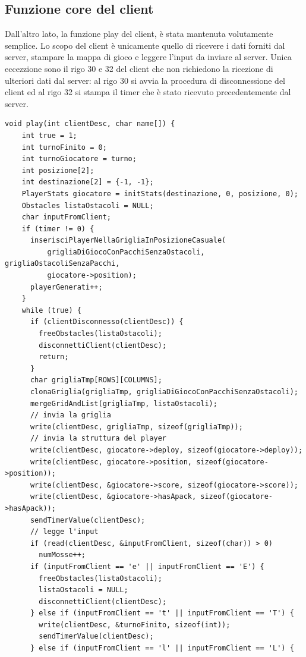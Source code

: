\documentclass[a4paper]{article}
\begin{document}
\subsection{Funzione core del client}
Dall'altro lato, la funzione play del client, è stata mantenuta volutamente semplice.
Lo scopo del client è unicamente quello di ricevere i dati forniti dal server, stampare la mappa di gioco e leggere l'input da inviare al server.
Unica eccezzione sono il rigo 30 e 32 del client che non richiedono la ricezione di ulteriori dati dal server: al rigo 30 si avvia la procedura di disconnessione del client ed al rigo 32 si stampa il timer che è stato ricevuto precedentemente dal server.
\pagebreak
\begin{lstlisting}[caption=Funzione play del server, label=alg:playServer]
  void play(int clientDesc, char name[]) {
    int true = 1;
    int turnoFinito = 0;
    int turnoGiocatore = turno;
    int posizione[2];
    int destinazione[2] = {-1, -1};
    PlayerStats giocatore = initStats(destinazione, 0, posizione, 0);
    Obstacles listaOstacoli = NULL;
    char inputFromClient;
    if (timer != 0) {
      inserisciPlayerNellaGrigliaInPosizioneCasuale(
          grigliaDiGiocoConPacchiSenzaOstacoli, grigliaOstacoliSenzaPacchi,
          giocatore->position);
      playerGenerati++;
    }
    while (true) {
      if (clientDisconnesso(clientDesc)) {
        freeObstacles(listaOstacoli);
        disconnettiClient(clientDesc);
        return;
      }
      char grigliaTmp[ROWS][COLUMNS];
      clonaGriglia(grigliaTmp, grigliaDiGiocoConPacchiSenzaOstacoli);
      mergeGridAndList(grigliaTmp, listaOstacoli);
      // invia la griglia
      write(clientDesc, grigliaTmp, sizeof(grigliaTmp));
      // invia la struttura del player
      write(clientDesc, giocatore->deploy, sizeof(giocatore->deploy));
      write(clientDesc, giocatore->position, sizeof(giocatore->position));
      write(clientDesc, &giocatore->score, sizeof(giocatore->score));
      write(clientDesc, &giocatore->hasApack, sizeof(giocatore->hasApack));
      sendTimerValue(clientDesc);
      // legge l'input
      if (read(clientDesc, &inputFromClient, sizeof(char)) > 0)
        numMosse++;
      if (inputFromClient == 'e' || inputFromClient == 'E') {
        freeObstacles(listaOstacoli);
        listaOstacoli = NULL;
        disconnettiClient(clientDesc);
      } else if (inputFromClient == 't' || inputFromClient == 'T') {
        write(clientDesc, &turnoFinito, sizeof(int));
        sendTimerValue(clientDesc);
      } else if (inputFromClient == 'l' || inputFromClient == 'L') {

\end{lstlisting}
\end{document}
